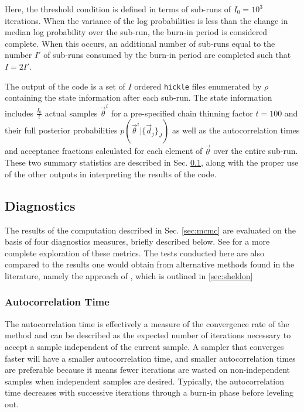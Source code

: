 \documentclass[preprint]{aastex}
\begin{document}
Here, the threshold condition is defined in terms of sub-runs of $I_{0}=10^{3}$ iterations.  When the variance of the log probabilities is less than the change in median log probability over the sub-run, the burn-in period is considered complete.  When this occurs, an additional number of sub-runs equal to the number $I'$ of sub-runs consumed by the burn-in period are completed such that $I=2I'$.  

The output of the code is a set of $I$ ordered \texttt{hickle} files enumerated by $\rho$ containing the state information after each sub-run.  The state information includes $\frac{I_{0}}{t}$ actual samples $\vec{\theta}^{i}$ for a pre-specified chain thinning factor $t=100$ and their full posterior probabilities $p(\vec{\theta}^{i}|\{\vec{d}_{j}\}_{J})$ as well as the autocorrelation times and acceptance fractions calculated for each element of $\vec{\theta}$ over the entire sub-run.  These two summary statistics are described in Sec. \ref{sec:diag}, along with the proper use of the other outputs in interpreting the results of the code.

\subsection{Diagnostics}
\label{sec:diag}

The results of the computation described in Sec. \ref{sec:mcmc} are evaluated on the basis of four diagnostics measures, briefly described below.  See \citet{for12} for a more complete exploration of these metrics.  The tests conducted here are also compared to the results one would obtain from alternative methods found in the literature, namely the approach of \citet{she11}, which is outlined in \ref{sec:sheldon}

\subsubsection{Autocorrelation Time}
\label{sec:acorr}

The autocorrelation time is effectively a measure of the convergence rate of the method and can be described as the expected number of iterations necessary to accept a sample independent of the current sample.  A sampler that converges faster will have a smaller autocorrelation time, and smaller autocorrelation times are preferable because it means fewer iterations are wasted on non-independent samples when independent samples are desired.  Typically, the autocorrelation time decreases with successive iterations through a burn-in phase before leveling out.
\end{document}
